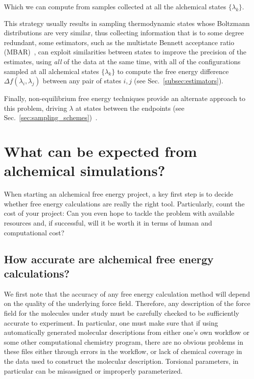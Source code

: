 \documentclass[9pt,bestpractices]{livecoms}
\begin{document}
Which we can compute from samples collected at all the alchemical states $\{\lambda_k \}$.



This strategy usually results in sampling thermodynamic states whose Boltzmann distributions are very similar, thus collecting information that is to some degree redundant, some estimators, such as the multistate Bennett acceptance ratio (MBAR)~\cite{shirts2008statisticallya}, can exploit similarities between states to improve the precision of the estimates, using \textit{all} of the data at the same time, with all of the configurations sampled at all alchemical states $\{\lambda_k \}$ to compute the free energy difference $\Delta f(\lambda_i, \lambda_{j})$ between any pair of states $i,j$ (see Sec.~\ref{subsec:estimators}).

Finally, non-equilibrium free energy techniques provide an alternate approach to this problem, driving $\lambda$ at states between the endpoints (see Sec.~\ref{sec:sampling_schemes})~\cite{jarzynski1997nonequilibrium,jarzynski1998equilibrium,crooks2000pathensemble, gapsys2020large}. 

\section{What can be expected from alchemical simulations?}
\label{sec:step0}
When starting an alchemical free energy project, a key first step is to decide whether free energy calculations are really the right tool. Particularly, count the cost of your
project: Can you even hope to tackle the problem with available resources and, if successful, will it
be worth it in terms of human and computational cost?

\subsection{How accurate are alchemical free energy calculations?}
\label{subsec:expectation}
We first note that the accuracy of any free energy calculation method will depend on the quality of the underlying force field.  Therefore, any description of the force field for the molecules under study must be carefully checked to be sufficiently accurate to experiment. In particular, one must make sure that if using automatically generated molecular descriptions from either one's own workflow or some other computational chemistry program, there are no obvious problems in these files either through errors in the workflow, or lack of chemical coverage in the data used to construct the molecular description. Torsional parameters, in particular can be misassigned or improperly parameterized. 
\end{document}
